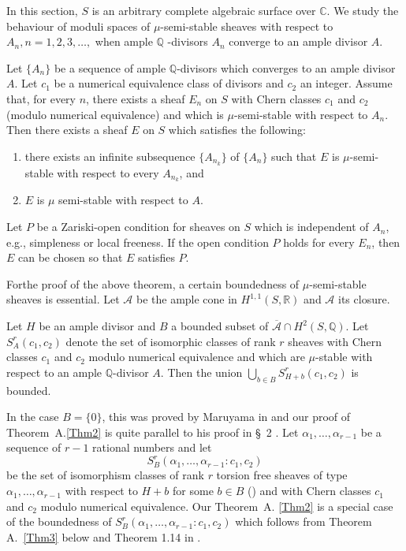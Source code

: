 In this section, $S$ is an arbitrary complete algebraic surface over
$\mathbb{C}$. We study the behaviour of moduli spaces of
$\mu$-semi-stable sheaves with respect to $A_n,n=1,2,3,\ldots,$ when
ample $\mathbb{Q}$ -divisors $A_n$ converge to an ample divisor $A$. 

\begin{Thm}\label{Thm1}
Let $\{A_n\}$ be a sequence of ample $\mathbb{Q}$-divisors which
converges to an ample divisor $A$. Let $c_1$ be a numerical
equivalence class of divisors and $c_2$ an integer. Assume that, for
every $n$, there exists a sheaf $E_n$ on $S$ with Chern classes $c_1$
and $c_2$ (modulo numerical equivalence) and which is
$\mu$-semi-stable with respect to $A_n$. Then there exists a sheaf $E$
on $S$ which satisfies the following: 
\begin{enumerate}
\renewcommand{\labelenumi}{(\theenumi)}
\item there exists an infinite subsequence $\{A_{n_{k}}\}$ of $\{A_n\}$
such that $E$ is $\mu$-semi-stable with respect to every $A_{n_{k}}$,
and 
\item $E$ is $\mu$ semi-stable with respect to $A$. 
\end{enumerate}
Let $P$ be a Zariski-open condition for sheaves on $S$ which is
independent of $A_n$, e.g., simpleness or local freeness. If the open
condition $P$ holds for every $E_n$, then $E$ can be chosen so that
$E$ satisfies $P$. 
\end{Thm}

For\pageoriginale the proof of the above theorem, a certain boundedness of
$\mu$-semi-stable sheaves is essential. Let $\mathscr{A}$ be the ample
cone in $H^{1,1}(S,\mathbb{R})$ and $\mathscr{A}$ its closure.

\begin{Thm}\label{Thm2}
Let $H$ be an ample divisor and $B$ a bounded subset of
$\overline{\mathscr{A}}\cap H^{2}(S,\mathbb{Q})$. Let
$S^{r}_A(c_1,c_2)$ denote the set of isomorphic classes of rank $r$
sheaves with Chern classes $c_1$ and $c_2$ modulo numerical
equivalence and which are $\mu$-stable with respect to an ample
$\mathbb{Q}$-divisor $A$. Then the union $\bigcup\limits_{b\in
B}S^{r}_{H+b}(c_1,c_2)$ is bounded. 
\end{Thm}

In the case $B=\{0\}$, this was proved by Maruyama in \cite{key8} and
our proof of Theorem~A.\ref{Thm2} is quite parallel to his proof in \S\
2 \cite{key8}. Let $\alpha_1,\ldots,\alpha_{r-1}$ be a sequence of
$r-1$ rational numbers and let
$$
S^{r}_B(\alpha_1,\ldots,\alpha_{r-1}:c_1,c_2)
$$ 
be the set of
isomorphism classes of rank $r$ torsion free sheaves of type
$\alpha_1,\ldots,\alpha_{r-1}$ with respect to $H+b$ for some $b\in B$ 
(\cite[see p.28]{key8}) and with Chern classes $c_1$ and $c_2$ modulo
numerical equivalence. Our Theorem~A. \ref{Thm2} is a special case of the
boundedness of $S^{r}_B(\alpha_1,\ldots,\alpha_{r-1}:c_1,c_2)$ which
follows from Theorem A.~\ref{Thm3} below and Theorem 1.14
in \cite{key8}.

